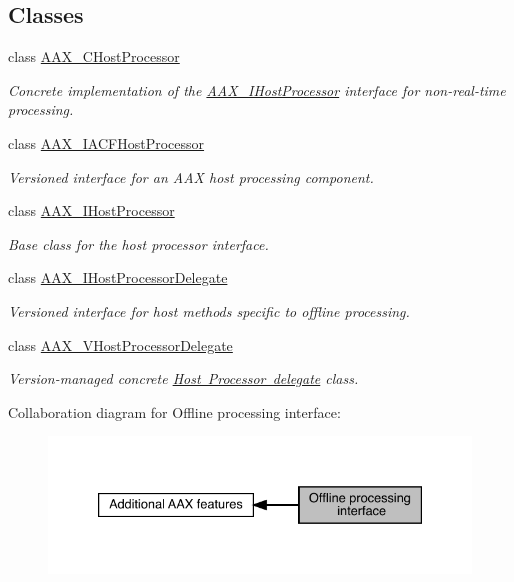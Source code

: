 \subsection*{Classes}
\begin{DoxyCompactItemize}
\item 
class \mbox{\hyperlink{a01485}{A\+A\+X\+\_\+\+C\+Host\+Processor}}
\begin{DoxyCompactList}\small\item\em Concrete implementation of the \mbox{\hyperlink{a01833}{A\+A\+X\+\_\+\+I\+Host\+Processor}} interface for non-\/real-\/time processing. \end{DoxyCompactList}\item 
class \mbox{\hyperlink{a01693}{A\+A\+X\+\_\+\+I\+A\+C\+F\+Host\+Processor}}
\begin{DoxyCompactList}\small\item\em Versioned interface for an A\+AX host processing component. \end{DoxyCompactList}\item 
class \mbox{\hyperlink{a01833}{A\+A\+X\+\_\+\+I\+Host\+Processor}}
\begin{DoxyCompactList}\small\item\em Base class for the host processor interface. \end{DoxyCompactList}\item 
class \mbox{\hyperlink{a01837}{A\+A\+X\+\_\+\+I\+Host\+Processor\+Delegate}}
\begin{DoxyCompactList}\small\item\em Versioned interface for host methods specific to offline processing. \end{DoxyCompactList}\item 
class \mbox{\hyperlink{a01921}{A\+A\+X\+\_\+\+V\+Host\+Processor\+Delegate}}
\begin{DoxyCompactList}\small\item\em Version-\/managed concrete \mbox{\hyperlink{a01837}{Host Processor delegate}} class. \end{DoxyCompactList}\end{DoxyCompactItemize}
Collaboration diagram for Offline processing interface\+:
\nopagebreak
\begin{figure}[H]
\begin{center}
\leavevmode
\includegraphics[width=333pt]{a00804}
\end{center}
\end{figure}
